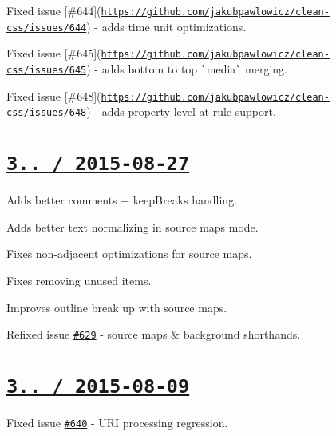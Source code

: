 \begin{DoxyItemize}
\item Fixed issue \mbox{[}\#644\mbox{]}(\href{https://github.com/jakubpawlowicz/clean-css/issues/644}{\tt https\+://github.\+com/jakubpawlowicz/clean-\/css/issues/644}) -\/ adds time unit optimizations.
\item Fixed issue \mbox{[}\#645\mbox{]}(\href{https://github.com/jakubpawlowicz/clean-css/issues/645}{\tt https\+://github.\+com/jakubpawlowicz/clean-\/css/issues/645}) -\/ adds bottom to top \`{}media\`{} merging.
\item Fixed issue \mbox{[}\#648\mbox{]}(\href{https://github.com/jakubpawlowicz/clean-css/issues/648}{\tt https\+://github.\+com/jakubpawlowicz/clean-\/css/issues/648}) -\/ adds property level at-\/rule support.
\end{DoxyItemize}

\section*{\href{https://github.com/jakubpawlowicz/clean-css/compare/v3.3.9...v3.3.10}{\tt 3.. / 2015-\/08-\/27} }


\begin{DoxyItemize}
\item Adds better comments + keep\+Breaks handling.
\item Adds better text normalizing in source maps mode.
\item Fixes non-\/adjacent optimizations for source maps.
\item Fixes removing unused items.
\item Improves {\ttfamily outline} break up with source maps.
\item Refixed issue \href{https://github.com/jakubpawlowicz/clean-css/issues/629}{\tt \#629} -\/ source maps \& background shorthands.
\end{DoxyItemize}

\section*{\href{https://github.com/jakubpawlowicz/clean-css/compare/v3.3.8...v3.3.9}{\tt 3.. / 2015-\/08-\/09} }


\begin{DoxyItemize}
\item Fixed issue \href{https://github.com/jakubpawlowicz/clean-css/issues/640}{\tt \#640} -\/ U\+RI processing regression.
\end{DoxyItemize}

